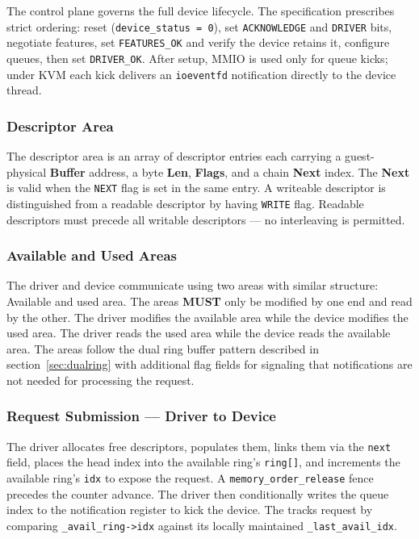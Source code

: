 \documentclass[12pt, a4paper, oneside]{report}
\begin{document}
The control plane governs the full device lifecycle.  The specification
prescribes strict ordering: reset (\texttt{device\_status = 0}), set
\texttt{ACKNOWLEDGE} and \texttt{DRIVER} bits, negotiate features, set
\texttt{FEATURES\_OK} and verify the device retains it, configure queues, then
set \texttt{DRIVER\_OK}.  After setup, MMIO is used only for queue kicks; under
KVM each kick delivers an \texttt{ioeventfd} notification directly to the device
thread.

\subsubsection{Descriptor Area}

The descriptor area is an array of descriptor entries each carrying a
guest-physical \textbf{Buffer} address, a byte \textbf{Len}, \textbf{Flags}, and a chain
\textbf{Next} index. The \textbf{Next} is valid when the \texttt{NEXT} flag is set in the same entry. A writeable descriptor is distinguished from a readable descriptor by having \texttt{WRITE} flag. Readable descriptors must precede all writable descriptors --- no interleaving is permitted.

\subsubsection{Available and Used Areas}

The driver and device communicate using two areas with similar structure: Available and used area. The areas \textbf{MUST} only be modified by one end and read by the other. The driver modifies the available area while the device modifies the used area. The driver reads the used area while the device reads the available area. The areas follow the dual ring buffer pattern described in section~\ref{sec:dualring} with additional flag fields for signaling that notifications are not needed for processing the request.

\subsubsection{Request Submission --- Driver to Device}

The driver allocates free descriptors, populates them, links them via the
\texttt{next} field, places the head index into the available ring's
\texttt{ring[]}, and increments the available ring's \texttt{idx} to expose the
request.  A \texttt{memory\_order\_release} fence precedes the counter advance.
The driver then conditionally writes the queue index to the notification register
to kick the device. The tracks request by comparing \texttt{\_avail\_ring->idx} against its locally maintained \texttt{\_last\_avail\_idx}. 
\end{document}
